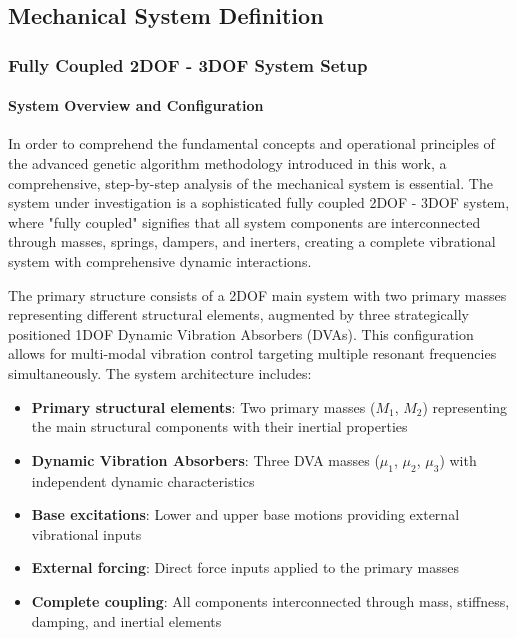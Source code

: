 \documentclass[12pt,a4paper]{article}
\begin{document}
\subsection{Mechanical System Definition}

\subsubsection{Fully Coupled 2DOF - 3DOF System Setup}
\paragraph{System Overview and Configuration}

In order to comprehend the fundamental concepts and operational principles of the advanced genetic algorithm methodology introduced in this work, a comprehensive, step-by-step analysis of the mechanical system is essential. The system under investigation is a sophisticated fully coupled 2DOF - 3DOF system, where "fully coupled" signifies that all system components are interconnected through masses, springs, dampers, and inerters, creating a complete vibrational system with comprehensive dynamic interactions.

The primary structure consists of a 2DOF main system with two primary masses representing different structural elements, augmented by three strategically positioned 1DOF Dynamic Vibration Absorbers (DVAs). This configuration allows for multi-modal vibration control targeting multiple resonant frequencies simultaneously. The system architecture includes:

\begin{itemize}
    \item \textbf{Primary structural elements}: Two primary masses ($M_1$, $M_2$) representing the main structural components with their inertial properties
    \item \textbf{Dynamic Vibration Absorbers}: Three DVA masses ($\mu_1$, $\mu_2$, $\mu_3$) with independent dynamic characteristics
    \item \textbf{Base excitations}: Lower and upper base motions providing external vibrational inputs
    \item \textbf{External forcing}: Direct force inputs applied to the primary masses
    \item \textbf{Complete coupling}: All components interconnected through mass, stiffness, damping, and inertial elements
\end{itemize}
\end{document}
